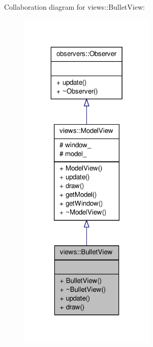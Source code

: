 \-Collaboration diagram for views\-:\-:\-Bullet\-View\-:
\nopagebreak
\begin{figure}[H]
\begin{center}
\leavevmode
\includegraphics[width=184pt]{dd/d3f/classviews_1_1BulletView__coll__graph}
\end{center}
\end{figure}
